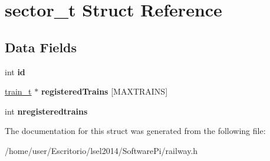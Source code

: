 \hypertarget{structsector__t}{\section{sector\-\_\-t \-Struct \-Reference}
\label{structsector__t}
}
\subsection*{\-Data \-Fields}
\begin{DoxyCompactItemize}
\item 
\hypertarget{structsector__t_a5a97661a7508857f0da6fc5366532c4a}{int {\bfseries id}}\label{structsector__t_a5a97661a7508857f0da6fc5366532c4a}

\item 
\hypertarget{structsector__t_ada50f819a6c99708c35069bc218fccc6}{\hyperlink{structtrain__t}{train\-\_\-t} $\ast$ {\bfseries registered\-Trains} \mbox{[}\-M\-A\-X\-T\-R\-A\-I\-N\-S\mbox{]}}\label{structsector__t_ada50f819a6c99708c35069bc218fccc6}

\item 
\hypertarget{structsector__t_a48d46e0b1f84a3fbc9568cdb919b0a1e}{int {\bfseries nregisteredtrains}}\label{structsector__t_a48d46e0b1f84a3fbc9568cdb919b0a1e}

\end{DoxyCompactItemize}


\-The documentation for this struct was generated from the following file\-:\begin{DoxyCompactItemize}
\item 
/home/user/\-Escritorio/lsel2014/\-Software\-Pi/railway.\-h\end{DoxyCompactItemize}
